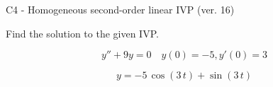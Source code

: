 \begin{exercise}
  \begin{exerciseTitle}C4 - Homogeneous second-order linear IVP (ver. 16)\end{exerciseTitle}
  \begin{exerciseStatement}
    
Find the solution to the given IVP.

    
\[y''+9y = 0 \hspace{1em} y(0) = -5 , y'(0) = 3\]

  \end{exerciseStatement}
  \begin{exerciseAnswer}
    
\[y= -5 \, \cos\left(3 \, t\right) + \sin\left(3 \, t\right)\]

  \end{exerciseAnswer}
\end{exercise}